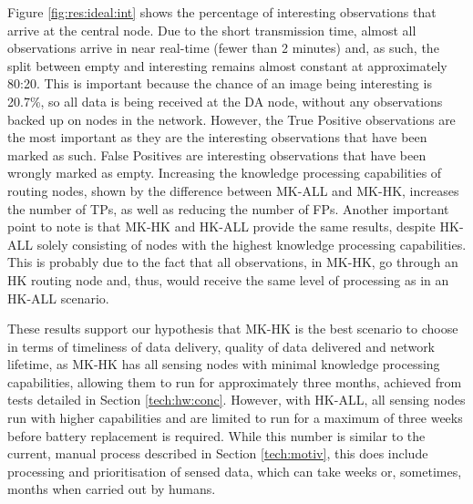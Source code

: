 Figure \ref{fig:res:ideal:int} shows the percentage of interesting observations that arrive at the central node. Due to the short transmission time, almost all observations arrive in near real-time (fewer than 2 minutes) and, as such, the split between empty and interesting remains almost constant at approximately 80:20. This is important because the chance of an image being interesting is 20.7\%, so all data is being received at the DA node, without any observations backed up on nodes in the network. However, the True Positive observations are the most important as they are the interesting observations that have been marked as such. False Positives are interesting observations that have been wrongly marked as empty. Increasing the knowledge processing capabilities of routing nodes, shown by the difference between MK-ALL and MK-HK, increases the number of TPs, as well as reducing the number of FPs. Another important point to note is that MK-HK and HK-ALL provide the same results, despite HK-ALL solely consisting of nodes with the highest knowledge processing capabilities.  This is probably due to the fact that all observations, in MK-HK, go through an HK routing node and, thus, would receive the same level of processing as in an HK-ALL scenario.

These results support our hypothesis that MK-HK is the best scenario to choose in terms of timeliness of data delivery, quality of data delivered and network lifetime, as MK-HK has all sensing nodes with minimal knowledge processing capabilities, allowing them to run for approximately three months, achieved from tests detailed in Section \ref{tech:hw:conc}. However, with HK-ALL, all sensing nodes run with higher capabilities and are limited to run for a maximum of three weeks before battery replacement is required. While this number is similar to the current, manual process described in Section \ref{tech:motiv}, this does include processing and prioritisation of sensed data, which can take weeks or, sometimes, months when carried out by humans.

